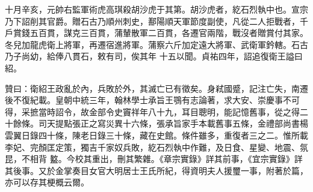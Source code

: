 \begin{pinyinscope}
 十月辛亥，元帥右監軍術虎高琪殺胡沙虎于其第。胡沙虎者，紇石烈執中也。宣宗乃下詔削其官爵。贈石古乃順州刺史，鄯陽順天軍節度副使，凡從二人拒戰者，千戶賞錢五百貫，謀克三百貫，蒲輦散軍二百貫，各遷官兩階，戰沒者贈賞付其家。冬兒加龍虎衛上將軍，再遷宿進將軍。蒲察六斤加定遠大將軍、武衛軍鈐轄。石古乃子尚幼，給俸八貫石，敕有司，俟其年
 十五以聞。貞祐四年，詔追復衛王謚曰紹。



 贊曰：衛紹王政亂於內，兵敗於外，其滅亡已有徵矣。身弒國蹙，記注亡失，南遷後不復紀載。皇朝中統三年，翰林學士承旨王鶚有志論著，求大安、崇慶事不可得，采摭當時詔令，故金部令史竇祥年八十九，耳目聰明，能記憶舊事，從之得二十餘條。司天提點張正之寫災異十六條，張承旨家手本載舊事五條，金禮部尚書楊雲翼日錄四十條，陳老日錄三十條，藏在史館。條件雖多，重復者三之二。惟所載李妃、完顏匡定策，獨吉千家奴兵敗，紇石烈執中作難，及日食、星變、地震、氛昆，不相背
 盭。今校其重出，刪其繁雜。《章宗實錄》詳其前事，《宜宗實錄》詳其後事。又於金掌奏目女官大明居士王氏所紀，得資明夫人援璽一事，附著於篇，亦可以存其梗概云爾。



\end{pinyinscope}